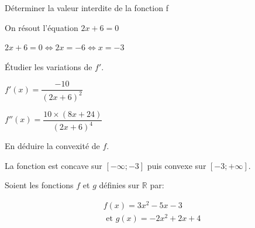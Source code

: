 \documentclass[11pt,a4paper]{article}  %
\begin{document}
		\begin{enumMet}
			\item Déterminer la valeur interdite de la fonction f
			\begin{corrBox}
				On résout l'équation $2x+6=0$
				
				$2x+6=0 \iff 2x=-6 \iff x=-3$		
			\end{corrBox}
			\item Étudier les variations de $f'$. 
			\begin{corrBox}
				$f'(x)=\dfrac{-10}{(2x+6)^2}$
				
				$f''(x)=\dfrac{10\times (8x+24)}{(2x+6)^4}$
				
			\end{corrBox}
			\item En déduire la convexité de $f$.
			
			\begin{corrBox}
				La fonction est concave sur $[-\infty ; -3]$ puis convexe sur $[-3 ; +\infty]$.
			\end{corrBox}
		\end{enumMet}
	
	\newpage
	Soient les fonctions $f$ et $g$ définies sur $\mathbb{R}$ par:
	
	$$
	\begin{gathered}
		f(x)=3 x^{2}-5 x-3 \\
		\text { et } g(x)=-2x^{2}+2x+4
	\end{gathered}
	$$
	
\end{document}
